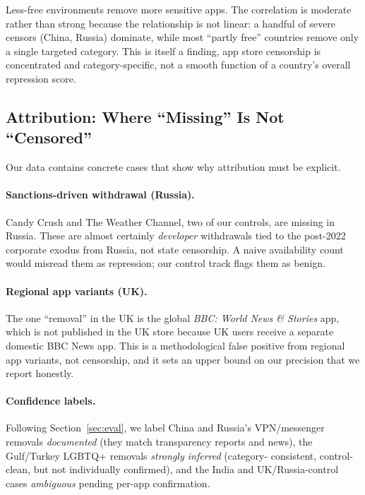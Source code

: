 Less-free environments remove more sensitive apps. The
correlation is moderate rather than strong because the relationship is not linear:
a handful of severe censors (China, Russia) dominate, while most ``partly free''
countries remove only a single targeted category. This is itself a finding, app
store censorship is concentrated and category-specific, not a smooth function of a
country's overall repression score.

\subsection{Attribution: Where ``Missing'' Is Not ``Censored''}

Our data contains concrete cases that show why attribution must be explicit.

\paragraph{Sanctions-driven withdrawal (Russia).} Candy Crush and The Weather
Channel, two of our controls, are missing in Russia. These are almost certainly
\emph{developer} withdrawals tied to the post-2022 corporate exodus from Russia,
not state censorship. A naive availability count would misread them as repression;
our control track flags them as benign.

\paragraph{Regional app variants (UK).} The one ``removal'' in the UK is the
global \emph{BBC: World News \& Stories} app, which is not published in the UK
store because UK users receive a separate domestic BBC News app. This is a
methodological false positive from regional app variants, not censorship, and it
sets an upper bound on our precision that we report honestly.

\paragraph{Confidence labels.} Following Section~\ref{sec:eval}, we label China and
Russia's VPN/messenger removals \emph{documented} (they match transparency reports
and news), the Gulf/Turkey LGBTQ+ removals \emph{strongly inferred} (category-
consistent, control-clean, but not individually confirmed), and the India and
UK/Russia-control cases \emph{ambiguous} pending per-app confirmation.
